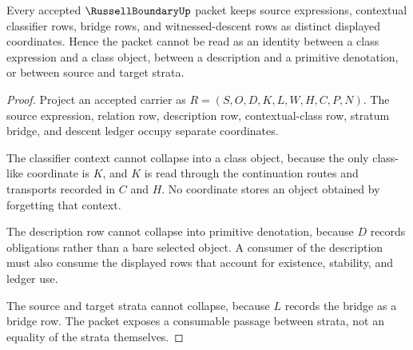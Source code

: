 \begin{theorem}
\label{thm:russell-boundary-namecert-noncollapse}
Every accepted $\RussellBoundaryUp$ packet keeps source expressions, contextual classifier rows, bridge rows, and witnessed-descent rows as distinct displayed coordinates. Hence the packet cannot be read as an identity between a class expression and a class object, between a description and a primitive denotation, or between source and target strata.
\end{theorem}
\begin{proof}
Project an accepted carrier as $R=(S,O,D,K,L,W,H,C,P,N)$. The source expression, relation row, description row, contextual-class row, stratum bridge, and descent ledger occupy separate coordinates.

The classifier context cannot collapse into a class object, because the only class-like coordinate is $K$, and $K$ is read through the continuation routes and transports recorded in $C$ and $H$. No coordinate stores an object obtained by forgetting that context.

The description row cannot collapse into primitive denotation, because $D$ records obligations rather than a bare selected object. A consumer of the description must also consume the displayed rows that account for existence, stability, and ledger use.

The source and target strata cannot collapse, because $L$ records the bridge as a bridge row. The packet exposes a consumable passage between strata, not an equality of the strata themselves.
\end{proof}

